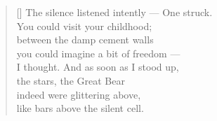 \documentclass[a4paper,12pt,twoside,final]{book}
\begin{document}
\begin{verse}[\versewidth]
  The silence listened intently --- One struck. \\
  You could visit your childhood; \\
  between the damp cement walls \\
  you could imagine a bit of freedom --- \\
  I thought. And as soon as I stood up, \\
  the stars, the Great Bear \\
  indeed were glittering above, \\
  like bars above the silent cell.
\end{verse}


\newpage

\settowidth{\versewidth}{gondoltam. S hát hát amint fölállok}
\end{document}
